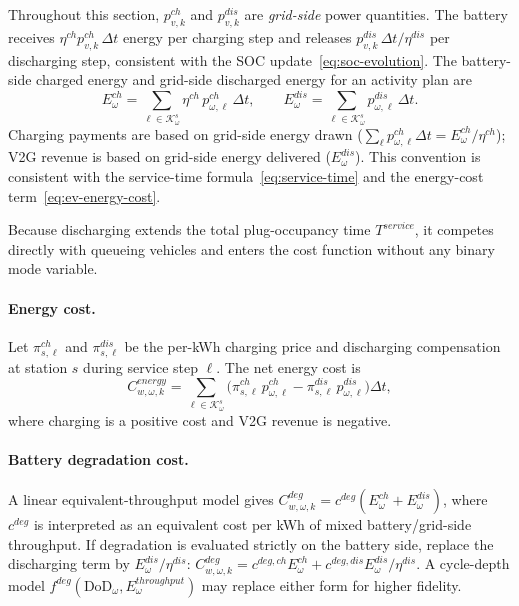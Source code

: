 \begin{remark}
  Throughout this section, $p^{ch}_{v,k}$ and $p^{dis}_{v,k}$ are
  \emph{grid-side} power quantities.  The battery receives
  $\eta^{ch}p^{ch}_{v,k}\,\Delta t$ energy per charging step and releases
  $p^{dis}_{v,k}\,\Delta t/\eta^{dis}$ per discharging step, consistent
  with the SOC update~\eqref{eq:soc-evolution}.  The battery-side charged
  energy and grid-side discharged energy for an activity plan are
  \begin{equation}
    E^{ch}_\omega
    = \sum_{\ell\in\mathcal{K}^s_\omega}
      \eta^{ch}\,p^{ch}_{\omega,\ell}\,\Delta t,
    \qquad
    E^{dis}_\omega
    = \sum_{\ell\in\mathcal{K}^s_\omega}
      p^{dis}_{\omega,\ell}\,\Delta t.
    \label{eq:energy-convention}
  \end{equation}
  Charging payments are based on grid-side energy drawn
  ($\sum_\ell p^{ch}_{\omega,\ell}\Delta t = E^{ch}_\omega/\eta^{ch}$);
  V2G revenue is based on grid-side energy delivered ($E^{dis}_\omega$).
  This convention is consistent with the service-time
  formula~\eqref{eq:service-time} and the energy-cost
  term~\eqref{eq:ev-energy-cost}.
\end{remark}
Because discharging extends the total plug-occupancy time
$T^{service}$, it competes directly with queueing vehicles and
enters the cost function without any binary mode variable.

\paragraph{Energy cost.}
Let $\pi^{ch}_{s,\ell}$ and $\pi^{dis}_{s,\ell}$ be the per-kWh
charging price and discharging compensation at station $s$ during
service step $\ell$.  The net energy cost is
\begin{equation}
  C^{energy}_{w,\omega,k}
  = \sum_{\ell \in \mathcal{K}^s_\omega}
    \bigl(\pi^{ch}_{s,\ell}\,p^{ch}_{\omega,\ell}
        - \pi^{dis}_{s,\ell}\,p^{dis}_{\omega,\ell}\bigr)\Delta t,
  \label{eq:ev-energy-cost}
\end{equation}
where charging is a positive cost and V2G revenue is negative.

\paragraph{Battery degradation cost.}
A linear equivalent-throughput model gives
$C^{deg}_{w,\omega,k} = c^{deg}(E^{ch}_\omega + E^{dis}_\omega)$,
where $c^{deg}$ is interpreted as an equivalent cost per kWh of mixed
battery/grid-side throughput.  If degradation is evaluated strictly on
the battery side, replace the discharging term by $E^{dis}_\omega/\eta^{dis}$:
$C^{deg}_{w,\omega,k} = c^{deg,ch}E^{ch}_\omega + c^{deg,dis}E^{dis}_\omega/\eta^{dis}$.
A cycle-depth model $f^{deg}(\mathrm{DoD}_\omega, E^{throughput}_\omega)$
may replace either form for higher fidelity.


